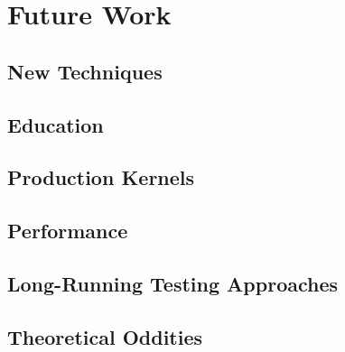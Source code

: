 \section{Future Work}
\label{sec:future}

\subsection{New Techniques}
\label{sec:future-new}

\subsection{Education}
\label{sec:future-education}

\subsection{Production Kernels}
\label{sec:future-linux}

\subsection{Performance}
\label{sec:future-perf}

\subsection{Long-Running Testing Approaches}
\label{sec:future-shaping}

\subsection{Theoretical Oddities}
\label{sec:future-theory}

